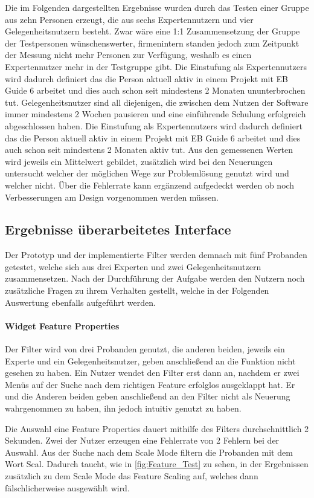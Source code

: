 Die im Folgenden dargestellten Ergebnisse wurden durch das Testen einer Gruppe aus zehn Personen erzeugt, die aus sechs Expertennutzern und vier Gelegenheitsnutzern besteht.
Zwar wäre eine 1:1 Zusammensetzung der Gruppe der Testpersonen wünschenswerter, firmenintern standen jedoch zum Zeitpunkt der Messung nicht mehr Personen zur Verfügung, weshalb es einen Expertennutzer mehr in der Testgruppe gibt.
Die Einstufung als Expertennutzers wird dadurch definiert das die Person aktuell aktiv in einem Projekt mit EB Guide 6 arbeitet und dies auch schon seit mindestens 2 Monaten ununterbrochen tut.
Gelegenheitsnutzer sind all diejenigen, die zwischen dem Nutzen der Software immer mindestens 2 Wochen pausieren und eine einführende Schulung erfolgreich abgeschlossen haben.
Die Einstufung als Expertennutzers wird dadurch definiert das die Person aktuell aktiv in einem Projekt mit EB Guide 6 arbeitet und dies auch schon seit mindestens 2 Monaten aktiv tut.
Aus den gemessenen Werten wird jeweils ein Mittelwert gebildet, zusätzlich wird bei den Neuerungen untersucht welcher der möglichen Wege zur Problemlösung genutzt wird und welcher nicht.
Über die Fehlerrate kann ergänzend aufgedeckt werden ob noch Verbesserungen am Design vorgenommen werden müssen.

\subsection{Ergebnisse überarbeitetes Interface}
Der Prototyp und der implementierte Filter werden demnach mit fünf Probanden getestet, welche sich aus drei Experten und zwei Gelegenheitsnutzern zusammensetzen.
Nach der Durchführung der Aufgabe werden den Nutzern noch zusätzliche Fragen zu ihrem Verhalten gestellt, welche in der Folgenden Auswertung ebenfalls aufgeführt werden.

\paragraph{Widget Feature Properties}
Der Filter wird von drei Probanden genutzt, die anderen beiden, jeweils ein Experte und ein Gelegenheitsnutzer, geben anschließend an die Funktion nicht gesehen zu haben.
Ein Nutzer wendet den Filter erst dann an, nachdem er zwei Menüs auf der Suche nach dem richtigen Feature erfolglos ausgeklappt hat.
Er und die Anderen beiden geben anschließend an den Filter nicht als Neuerung wahrgenommen zu haben, ihn jedoch intuitiv genutzt zu haben.

Die Auswahl eine Feature Properties dauert mithilfe des Filters durchschnittlich 2 Sekunden.
Zwei der Nutzer erzeugen eine Fehlerrate von 2 Fehlern bei der Auswahl.
Aus der Suche nach dem Scale Mode filtern die Probanden mit dem Wort \glqq Scal\grqq{}.
Dadurch taucht, wie in \ref{fig:Feature_Test} zu sehen, in der Ergebnissen zusätzlich zu dem Scale Mode das Feature Scaling auf, welches dann fälschlicherweise ausgewählt wird.

